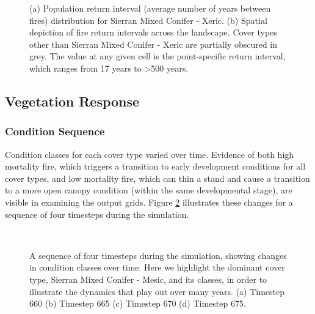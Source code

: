 \begin{figure}[!htbp]
  \centering
  \caption{(a) Population return interval (average number of years between fires) distribution for Sierran Mixed Conifer - Xeric.  (b) Spatial depiction of fire return intervals across the landscape. Cover types other than Sierran Mixed Conifer - Xeric are partially obscured in grey. The value at any given cell is the point-specific return interval, which ranges from 17 years to \textgreater 500 years.}
\label{fig:preturn_smcx}
\end{figure}

\clearpage

\subsection{Vegetation Response}
\label{subsec:HRVvegresponse}

\subsubsection{Condition Sequence}

Condition classes for each cover type varied over time. Evidence of both high mortality fire, which triggers a transition to early development conditions for all cover types, and low mortality fire, which can thin a stand and cause a transition to a more open canopy condition (within the same developmental stage), are visible in examining the output grids. Figure \ref{fig:covcondmaps} illustrates these changes for a sequence of four timesteps during the simulation.

\begin{figure}[!htbp]
  \centering
  \\%
  \caption{A sequence of four timesteps during the simulation, showing changes in condition classes over time. Here we highlight the dominant cover type, Sierran Mixed Conifer - Mesic, and its classes, in order to illustrate the dynamics that play out over many years. (a) Timestep 660 (b) Timestep 665 (c) Timestep 670 (d) Timestep 675.}
  \label{fig:covcondmaps}
\end{figure}




